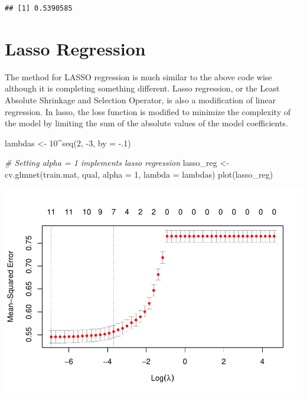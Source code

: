 \documentclass[
]{book}
\newenvironment{Shaded}{\begin{snugshade}}{\end{snugshade}}
\newcommand{\AttributeTok}[1]{\textcolor[rgb]{0.77,0.63,0.00}{#1}}
\newcommand{\CommentTok}[1]{\textcolor[rgb]{0.56,0.35,0.01}{\textit{#1}}}
\newcommand{\DecValTok}[1]{\textcolor[rgb]{0.00,0.00,0.81}{#1}}
\newcommand{\FunctionTok}[1]{\textcolor[rgb]{0.00,0.00,0.00}{#1}}
\newcommand{\NormalTok}[1]{#1}
\newcommand{\OtherTok}[1]{\textcolor[rgb]{0.56,0.35,0.01}{#1}}
\newcommand{\SpecialCharTok}[1]{\textcolor[rgb]{0.00,0.00,0.00}{#1}}
\begin{document}
\begin{verbatim}
## [1] 0.5390585
\end{verbatim}

\hypertarget{lasso-regression-1}{%
\section{Lasso Regression}\label{lasso-regression-1}}

The method for LASSO regression is much similar to the above code wise although it is completing something different. Lasso regression, or the Least Absolute Shrinkage and Selection Operator, is also a modification of linear regression. In lasso, the loss function is modified to minimize the complexity of the model by limiting the sum of the absolute values of the model coefficients. \citet{regression_r}

\begin{Shaded}
\begin{Highlighting}[]
\NormalTok{lambdas }\OtherTok{\textless{}{-}} \DecValTok{10}\SpecialCharTok{\^{}}\FunctionTok{seq}\NormalTok{(}\DecValTok{2}\NormalTok{, }\SpecialCharTok{{-}}\DecValTok{3}\NormalTok{, }\AttributeTok{by =} \SpecialCharTok{{-}}\NormalTok{.}\DecValTok{1}\NormalTok{)}

\CommentTok{\# Setting alpha = 1 implements lasso regression}
\NormalTok{lasso\_reg }\OtherTok{\textless{}{-}} \FunctionTok{cv.glmnet}\NormalTok{(train.mat, qual, }\AttributeTok{alpha =} \DecValTok{1}\NormalTok{, }\AttributeTok{lambda =}\NormalTok{ lambdas)}
\FunctionTok{plot}\NormalTok{(lasso\_reg)}
\end{Highlighting}
\end{Shaded}

\includegraphics{FinalProject-Bright-Santoro_files/figure-latex/unnamed-chunk-47-1.pdf}
\end{document}
